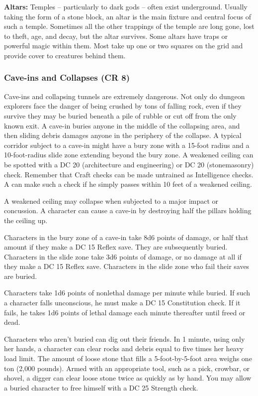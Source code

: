 \textbf{Altars:} Temples -- particularly to dark gods -- often exist underground. Usually taking the form of a stone block, an altar is the main fixture and central focus of such a temple. Sometimes all the other trappings of the temple are long gone, lost to theft, age, and decay, but the altar survives. Some altars have traps or powerful magic within them. Most take up one or two squares on the grid and provide cover to creatures behind them. 

\subsubsection{Cave-ins and Collapses (CR 8)}

Cave-ins and collapsing tunnels are extremely dangerous. Not only do dungeon explorers face the danger of being crushed by tons of falling rock, even if they survive they may be buried beneath a pile of rubble or cut off from the only known exit. A cave-in buries anyone in the middle of the collapsing area, and then sliding debris damages anyone in the periphery of the collapse. A typical corridor subject to a cave-in might have a bury zone with a 15-foot radius and a 10-foot-radius slide zone extending beyond the bury zone. A weakened ceiling can be spotted with a DC 20  (architecture and engineering) or DC 20  (stonemasonry) check. Remember that Craft checks can be made untrained as Intelligence checks. A  can make such a check if he simply passes within 10 feet of a weakened ceiling.

A weakened ceiling may collapse when subjected to a major impact or concussion. A character can cause a cave-in by destroying half the pillars holding the ceiling up.

Characters in the bury zone of a cave-in take 8d6 points of damage, or half that amount if they make a DC 15 Reflex save. They are subsequently buried. Characters in the slide zone take 3d6 points of damage, or no damage at all if they make a DC 15 Reflex save. Characters in the slide zone who fail their saves are buried.

Characters take 1d6 points of nonlethal damage per minute while buried. If such a character falls unconscious, he must make a DC 15 Constitution check. If it fails, he takes 1d6 points of lethal damage each minute thereafter until freed or dead.

Characters who aren't buried can dig out their friends. In 1 minute, using only her hands, a character can clear rocks and debris equal to five times her heavy load limit. The amount of loose stone that fills a 5-foot-by-5-foot area weighs one ton (2,000 pounds). Armed with an appropriate tool, such as a pick, crowbar, or shovel, a digger can clear loose stone twice as quickly as by hand. You may allow a buried character to free himself with a DC 25 Strength check.

